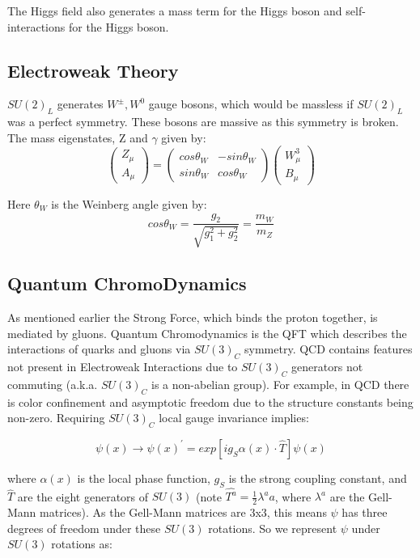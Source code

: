The Higgs field also generates a mass term for the Higgs boson and self-interactions for the Higgs boson. 

\subsection{Electroweak Theory}
$SU(2)_{L}$ generates $W^{\pm}, W^{0}$ gauge bosons, which would be massless if $SU(2)_{L}$ was a perfect symmetry. These bosons are massive as this symmetry is broken. The mass eigenstates, Z and $\gamma$ given by: 
\begin{equation}
\begin{pmatrix} Z_{\mu} \\ A_{\mu} \end{pmatrix} = \begin{pmatrix} cos \theta_{W} & -sin \theta_{W} \\ sin \theta_{W} & cos \theta_{W} \end{pmatrix} \begin{pmatrix} W^{3}_{\mu} \\ B_{\mu} \end{pmatrix}
\end{equation} 

Here $\theta_{W}$ is the Weinberg angle given by: 
\begin{equation}
cos\theta_{W}=\frac{g_{2}}{\sqrt{g_{1}^{2}+g_{2}^{2}}} = \frac{m_{W}}{m_{Z}}
\end{equation}
\subsection{Quantum ChromoDynamics}
As mentioned earlier the Strong Force, which binds the proton together, is mediated by gluons. Quantum Chromodynamics is the QFT which describes the interactions of quarks and gluons via $SU(3)_C$ symmetry. QCD contains features not present in Electroweak Interactions due to $SU(3)_C$ generators not commuting (a.k.a. $SU(3)_C$ is a non-abelian group). For example, in QCD there is color confinement and asymptotic freedom due to the structure constants being non-zero. Requiring $SU(3)_C$ local gauge invariance implies:

\begin{equation}
\psi(x) \rightarrow \psi(x)^{'} = exp[ig_{S}\alpha(x)\cdot\hat{T}]\psi(x)
\end{equation}

where $\alpha(x)$ is the local phase function, $g_{S}$ is the strong coupling constant, and $\hat{T}$ are the eight generators of $SU(3)$ (note $\hat{T^{a}}=\frac{1}{2}\lambda^{a} a$, where $\lambda^{a}$ are the Gell-Mann matrices). As the Gell-Mann matrices are 3x3, this means $\psi$ has three degrees of freedom under these $SU(3)$ rotations. So we represent $\psi$ under $SU(3)$ rotations as:

